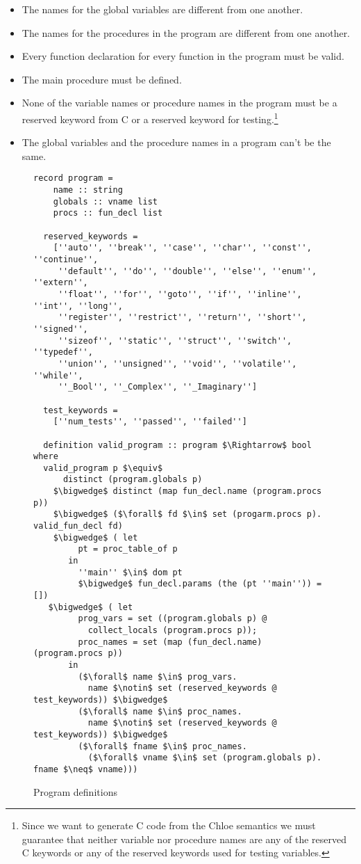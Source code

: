 \begin{itemize}
  \item{The names for the global variables are different from one another.}
  \item{The names for the procedures in the program are different from one another.}
  \item{Every function declaration for every function in the program must be valid.}
  \item{The main procedure must be defined.}
  \item{None of the variable names or procedure names in the program must be a reserved keyword from C or a reserved keyword for testing.\footnote{Since we want to generate C code from the Chloe semantics we must guarantee that neither variable nor procedure names are any of the reserved C keywords or any of the reserved keywords used for testing variables.}}
  \item{The global variables and the procedure names in a program can't be the same.}
\end{itemize}



\begin{figure}
  \begin{lstlisting}[frame=single, mathescape=true]
  record program =
    name :: string
    globals :: vname list
    procs :: fun_decl list

  reserved_keywords =
    [''auto'', ''break'', ''case'', ''char'', ''const'', ''continue'',
     ''default'', ''do'', ''double'', ''else'', ''enum'', ''extern'',
     ''float'', ''for'', ''goto'', ''if'', ''inline'', ''int'', ''long'',
     ''register'', ''restrict'', ''return'', ''short'', ''signed'',
     ''sizeof'', ''static'', ''struct'', ''switch'', ''typedef'',
     ''union'', ''unsigned'', ''void'', ''volatile'', ''while'',
     ''_Bool'', ''_Complex'', ''_Imaginary'']

  test_keywords =
    [''num_tests'', ''passed'', ''failed'']

  definition valid_program :: program $\Rightarrow$ bool where
  valid_program p $\equiv$
      distinct (program.globals p)
    $\bigwedge$ distinct (map fun_decl.name (program.procs p))
    $\bigwedge$ ($\forall$ fd $\in$ set (progarm.procs p). valid_fun_decl fd)
    $\bigwedge$ ( let
         pt = proc_table_of p
       in
         ''main'' $\in$ dom pt
         $\bigwedge$ fun_decl.params (the (pt ''main'')) = [])
   $\bigwedge$ ( let
         prog_vars = set ((program.globals p) @
           collect_locals (program.procs p));
         proc_names = set (map (fun_decl.name) (program.procs p))
       in
         ($\forall$ name $\in$ prog_vars.
           name $\notin$ set (reserved_keywords @ test_keywords)) $\bigwedge$
         ($\forall$ name $\in$ proc_names.
           name $\notin$ set (reserved_keywords @ test_keywords)) $\bigwedge$
         ($\forall$ fname $\in$ proc_names.
           ($\forall$ vname $\in$ set (program.globals p). fname $\neq$ vname)))
  \end{lstlisting}

  \caption{Program definitions}
  \label{fig:prog_def}
\end{figure}



